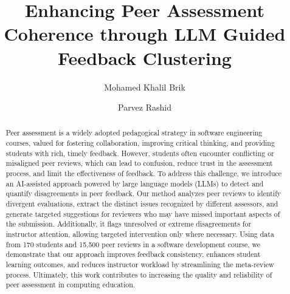 \documentclass[manuscript,review, anonymous]{acmart}
\begin{document}
\title{Enhancing Peer Assessment Coherence through LLM Guided Feedback Clustering}

\author{Mohamed Khalil Brik}

\author{Parvez Rashid}

\begin{abstract}
Peer assessment is a widely adopted pedagogical strategy in software engineering courses, valued for fostering collaboration, improving critical thinking, and providing students with rich, timely feedback. However, students often encounter conflicting or misaligned peer reviews, which can lead to confusion, reduce trust in the assessment process, and limit the effectiveness of feedback. To address this challenge, we introduce an AI-assisted approach powered by large language models (LLMs) to detect and quantify disagreements in peer feedback. Our method analyzes peer reviews to identify divergent evaluations, extract the distinct issues recognized by different assessors, and generate targeted suggestions for reviewers who may have missed important aspects of the submission. Additionally, it flags unresolved or extreme disagreements for instructor attention, allowing targeted intervention only where necessary. Using data from 170 students and 15,500 peer reviews in a software development course, we demonstrate that our approach improves feedback consistency, enhances student learning outcomes, and reduces instructor workload by streamlining the meta-review process. Ultimately, this work contributes to increasing the quality and reliability of peer assessment in computing education.


\end{abstract}
\end{document}

